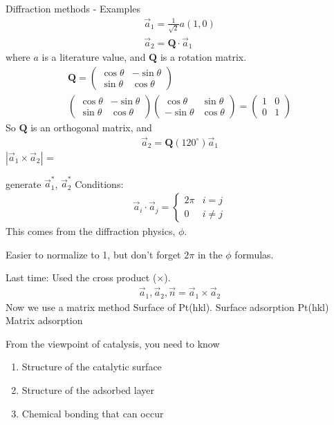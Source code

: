 \documentclass{article}
\newcommand{\matr}[1]{\bm{#1}}
\newcommand{\norm}[1]{\left|#1\right|}
\newcommand{\aone}[0]{\vec{a}_1}
\newcommand{\atwo}[0]{\vec{a}_2}
\newcommand{\nvec}[0]{\vec{n}}
\begin{document}
\begin{section}{Diffraction methods - Examples}
\begin{align*}
	\aone = \frac{1}{\sqrt{2}}a(1,0)\\
	\atwo = \matr{Q}\cdot \aone
\end{align*}
where $a$ is a literature value, and $\matr{Q}$ is a rotation matrix.
\begin{align*}
	\matr{Q} = \begin{pmatrix}\cos\theta & -\sin\theta\\\sin\theta & \cos\theta\end{pmatrix}\\
	\begin{pmatrix}\cos\theta & -\sin\theta\\\sin\theta & \cos\theta\end{pmatrix}\begin{pmatrix}\cos\theta & \sin\theta\\-\sin\theta & \cos\theta\end{pmatrix} = \begin{pmatrix}1&0\\0&1\end{pmatrix}
\end{align*}
So $\matr{Q}$ is an orthogonal matrix, and
\begin{align*}
	\atwo = \matr{Q} (120^\circ)\aone
\end{align*}
$\norm{\aone\times\atwo}$ = 

generate $\aone^\ast$, $\atwo^\ast$
Conditions:
\begin{align*}
	\vec{a}_i \cdot \vec{a}_j = \begin{cases}2\pi & i=j\\0 & i\neq j\end{cases}
\end{align*}
This comes from the diffraction physics, $\phi$.

Easier to normalize to 1, but don't forget $2\pi$ in the $\phi$ formulas.

Last time: Used the cross product ($\times$).
\begin{align*}
	\aone,\atwo,\nvec = \aone\times\atwo
\end{align*}
Now we use a matrix method
Surface of Pt(hkl).
Surface adsorption
Pt(hkl) Matrix adsorption

From the viewpoint of catalysis, you need to know
\begin{enumerate}
	\item Structure of the catalytic surface
	\item Structure of the adsorbed layer
	\item Chemical bonding that can occur
\end{enumerate}


\end{section}
\end{document}
